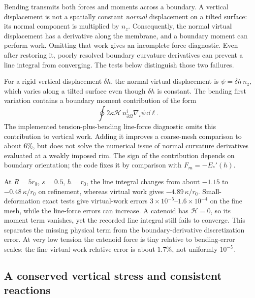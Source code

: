 Bending transmits both forces and moments across a boundary. A vertical displacement is not a spatially constant \emph{normal} displacement on a tilted surface: its normal component is multiplied by $n_z$. Consequently, the normal virtual displacement has a derivative along the membrane, and a boundary moment can perform work. Omitting that work gives an incomplete force diagnostic. Even after restoring it, poorly resolved boundary curvature derivatives can prevent a line integral from converging. The tests below distinguish those two failures.


For a rigid vertical displacement $\delta h$, the normal virtual displacement is $\psi=\delta h\,n_z$, which varies along a tilted surface even though $\delta h$ is constant. The bending first variation contains a boundary moment contribution of the form
\begin{equation}
\oint 2\kappa\mathcal H\,n^i_{\partial\Omega}\nabla_i\psi\,\dd\ell.
\end{equation}
The implemented tension-plus-bending line-force diagnostic omits this contribution to vertical work. Adding it improves a coarse-mesh comparison to about $6\%$, but does not solve the numerical issue of normal curvature derivatives evaluated at a weakly imposed rim. The sign of the contribution depends on boundary orientation; the code fixes it by comparison with $F_m=-E_*'(h)$.

At $R=5r_0$, $s=0.5$, $h=r_0$, the line integral changes from about $-1.15$ to $-0.48\,\kappa/r_0$ on refinement, whereas virtual work gives $-4.89\,\kappa/r_0$. Small-deformation exact tests give virtual-work errors $3\times10^{-5}$--$1.6\times10^{-4}$ on the fine mesh, while the line-force errors can increase. A catenoid has $\mathcal H=0$, so its moment term vanishes, yet the recorded line integral still fails to converge. This separates the missing physical term from the boundary-derivative discretization error. At very low tension the catenoid force is tiny relative to bending-error scales: the fine virtual-work relative error is about $1.7\%$, not uniformly $10^{-5}$.




\subsection{A conserved vertical stress and consistent reactions}


